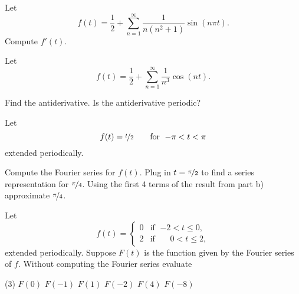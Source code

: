 \begin{exercise}
Let
\begin{equation*}
f(t) = \frac{1}{2} + \sum_{n=1}^\infty
\frac{1}{n(n^2+1)}
\sin(n\pi t) .
\end{equation*}
Compute $f'(t)$.
\end{exercise}

\begin{exercise}
Let
\begin{equation*}
f(t) = \frac{1}{2} + \sum_{n=1}^\infty
\frac{1}{n^3}
\cos(n t) .
\end{equation*}
\begin{tasks}
\task Find the antiderivative.
\task Is the antiderivative periodic?
\end{tasks}
\end{exercise}

\begin{exercise}
Let
\begin{equation*}
f(t) = \nicefrac{t}{2} \qquad \text{for } \; {-\pi} < t < \pi
\end{equation*}
extended periodically.
\begin{tasks}
\task Compute the Fourier series for $f(t)$.
\task Plug in $t=\nicefrac{\pi}{2}$ to find a series representation
for $\nicefrac{\pi}{4}$.
\task Using the first 4 terms of the result from part b) approximate
$\nicefrac{\pi}{4}$.
\end{tasks}
\end{exercise}

\begin{exercise}
Let
\begin{equation*}
f(t) = 
\begin{cases}
0 & \text{if } \; {-2} < t \leq 0, \\
2 & \text{if } \; \phantom{-}0 < t \leq 2,
\end{cases}
\end{equation*}
extended periodically.  Suppose $F(t)$ is the function given
by the Fourier series of $f$.  Without computing the Fourier series
evaluate
\begin{tasks}(3)
\task $F(0)$
\task $F(-1)$
\task $F(1)$
\task $F(-2)$
\task $F(4)$
\task $F(-8)$
\end{tasks}
\end{exercise}

